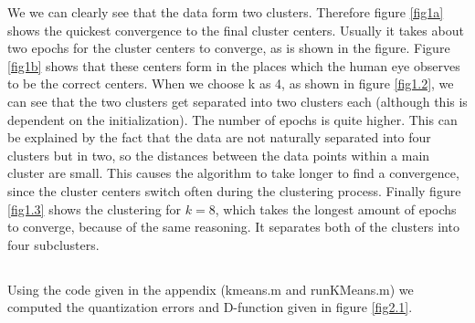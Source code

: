 \documentclass[10pt]{article}
\begin{document}
\noindent We we can clearly see that the data form two clusters. Therefore figure \ref{fig1a} shows the quickest convergence to the final cluster centers. Usually it takes about two epochs for the cluster centers to converge, as is shown in the figure. Figure \ref{fig1b} shows that these centers form in the places which the human eye observes to be the correct centers. When we choose k as 4, as shown in figure \ref{fig1.2}, we can see that the two clusters get separated into two clusters each (although this is dependent on the initialization). The number of epochs is quite higher. This can be explained by the fact that the data are not naturally separated into four clusters but in two, so the distances between the data points within a main cluster are small. This causes the algorithm to take longer to find a convergence, since the cluster centers switch often during the clustering process. Finally figure \ref{fig1.3} shows the clustering for $k = 8$, which takes the longest amount of epochs to converge, because of the same reasoning. It separates both of the clusters into four subclusters. 

\subsection{}
Using the code given in the appendix (kmeans.m and runKMeans.m) we computed the quantization errors and D-function given in figure \ref{fig2.1}.
\end{document}

